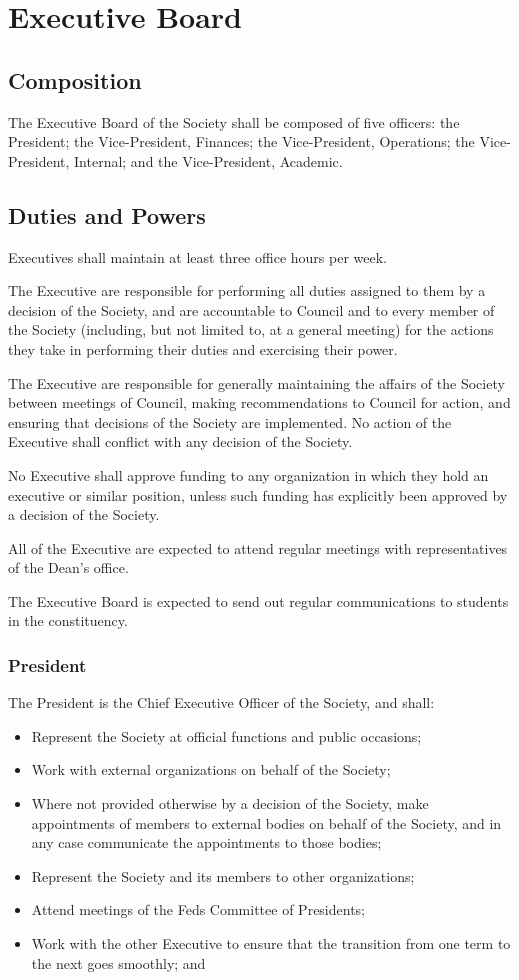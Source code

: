 \section{Executive Board}
\subsection{Composition}
The Executive Board of the Society shall be composed of five officers: the
President; the Vice-President, Finances; the Vice-President, Operations; the
Vice-President, Internal; and the Vice-President, Academic.

\subsection{Duties and Powers}
Executives shall maintain at least three office hours per week.


The Executive are responsible for performing all duties assigned to them by a
decision of the Society, and are accountable to Council and to every member of
the Society (including, but not limited to, at a general meeting) for the
actions they take in performing their duties and exercising their power.

The Executive are responsible for generally maintaining the affairs of the
Society between meetings of Council, making recommendations to Council for
action, and ensuring that decisions of the Society are implemented. No action of
the Executive shall conflict with any decision of the Society.

No Executive shall approve funding to any organization in which they hold an
executive or similar position, unless such funding has explicitly been approved
by a decision of the Society.

All of the Executive are expected to attend regular meetings with representatives of
the Dean’s office.

The Executive Board is expected to send out regular communications to students in
the constituency.

\subsubsection{President}
The President is the Chief Executive Officer of the Society, and shall:
\begin{itemize}
  \item Represent the Society at official functions and public occasions;
  \item Work with external organizations on behalf of the Society;
  \item Where not provided otherwise by a decision of the Society, make
    appointments of members to external bodies on behalf of the Society, and in
    any case communicate the appointments to those bodies;
  \item Represent the Society and its members to other organizations;
  \item Attend meetings of the Feds Committee of Presidents;
  \item Work with the other Executive to ensure that the transition from one
    term to the next goes smoothly; and
\end{itemize}


